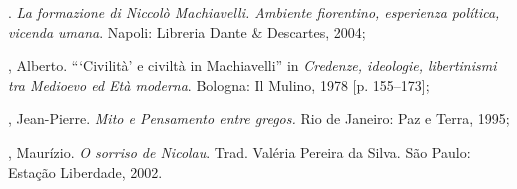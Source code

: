 \begin{bibliohedra}
\titidem. \emph{La formazione di Niccolò Machiavelli. Ambiente
fiorentino, esperienza política, vicenda umana}. Napoli: Libreria Dante
\& Descartes, 2004;

, Alberto. ```Civilità' e civiltà in Machiavelli'' in
\emph{Credenze, ideologie, libertinismi tra Medioevo ed Età moderna}.
Bologna: Il Mulino, 1978 {[}p. 155--173{]};

, Jean-Pierre. \emph{Mito e Pensamento entre gregos.} Rio de
Janeiro: Paz e Terra, 1995;

, Maurízio. \emph{O sorriso de Nicolau}. Trad. Valéria Pereira da
Silva. São Paulo: Estação Liberdade, 2002.
\end{bibliohedra}